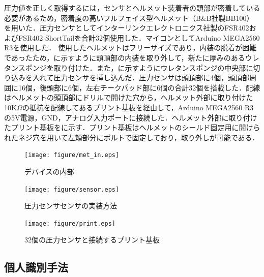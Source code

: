 \documentclass[Japanese,noauthor]{dicomopapers}
\begin{document}
圧力値を正しく取得するには，センサとヘルメット装着者の頭部が密着している必要があるため，密着度の高いフルフェイス型ヘルメット（B\&B社製BB100）を用いた．圧力センサとしてインターリンクエレクトロニクス社製のFSR402およびFSR402 ShortTailを合計32個使用した．マイコンとしてArduino MEGA2560 R3を使用した．
使用したヘルメットはフリーサイズであり，内装の脱着が困難であったため，に示すように頭頂部の内装を取り外して，新たに厚みのあるウレタンスポンジを取り付けた．また，に示すようにウレタンスポンジの中央部に切り込みを入れて圧力センサを挿し込んだ．圧力センサは頭頂部に4個，頭頂部周囲に16個，後頭部に6個，左右チークパッド部に6個の合計32個を搭載した．配線はヘルメットの頭頂部にドリルで開けた穴から，ヘルメット外部に取り付けた10K$\Omega$の抵抗を配線してあるプリント基板を経由して，Arduino MEGA2560 R3の5V電源，GND，アナログ入力ポートに接続した．ヘルメット外部に取り付けたプリント基板をに示す．プリント基板はヘルメットのシールド固定用に開けられたネジ穴を用いて左頬部分にボルトで固定しており，取り外しが可能である．

\begin{figure}[!t]
  \begin{center}
    \texttt{[image: figure/met\_in.eps]}
  \end{center}
  \caption{デバイスの内部}
  \label{met_in}
\end{figure}

\begin{figure}[!t]
  \begin{center}
    \texttt{[image: figure/sensor.eps]}
  \end{center}
  \caption{圧力センサセンサの実装方法}
  \label{sensor}
\end{figure}

\begin{figure}[!t]
  \begin{center}
    \texttt{[image: figure/print.eps]}
  \end{center}
  \caption{32個の圧力センサと接続するプリント基板}
  \label{print}
\end{figure}


\subsection{個人識別手法}
\end{document}
